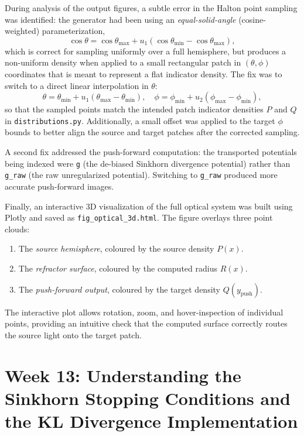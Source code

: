 \documentclass{article}
\begin{document}
During analysis of the output figures, a subtle error in the Halton point sampling was identified: the generator had been using an \emph{equal-solid-angle} (cosine-weighted) parameterization,
\begin{equation}
    \cos\theta = \cos\theta_{\max} + u_1(\cos\theta_{\min} - \cos\theta_{\max}),
\end{equation}
which is correct for sampling uniformly over a full hemisphere, but produces a non-uniform density when applied to a small rectangular patch in $(\theta, \phi)$ coordinates that is meant to represent a flat indicator density. The fix was to switch to a direct linear interpolation in $\theta$:
\begin{equation}
    \theta = \theta_{\min} + u_1(\theta_{\max} - \theta_{\min}), \quad \phi = \phi_{\min} + u_2(\phi_{\max} - \phi_{\min}),
\end{equation}
so that the sampled points match the intended patch indicator densities $P$ and $Q$ in \texttt{distributions.py}. Additionally, a small offset was applied to the target $\phi$ bounds to better align the source and target patches after the corrected sampling.

A second fix addressed the push-forward computation: the transported potentials being indexed were \texttt{g} (the de-biased Sinkhorn divergence potential) rather than \texttt{g\_raw} (the raw unregularized potential). Switching to \texttt{g\_raw} produced more accurate push-forward images.

Finally, an interactive 3D visualization of the full optical system was built using Plotly and saved as \texttt{fig\_optical\_3d.html}. The figure overlays three point clouds:
\begin{enumerate}
    \item The \emph{source hemisphere}, coloured by the source density $P(x)$.
    \item The \emph{refractor surface}, coloured by the computed radius $R(x)$.
    \item The \emph{push-forward output}, coloured by the target density $Q(y_{\text{push}})$.
\end{enumerate}
The interactive plot allows rotation, zoom, and hover-inspection of individual points, providing an intuitive check that the computed surface correctly routes the source light onto the target patch.


\section{Week 13: Understanding the Sinkhorn Stopping Conditions and the KL Divergence Implementation}
\end{document}
